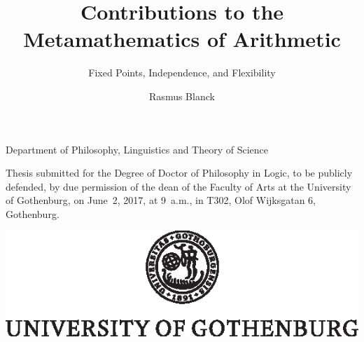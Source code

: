 \documentclass[paper=148mm:209mm,twoside,pagesize=pdftex]{scrartcl}
\title{Contributions to the Metamathematics of Arithmetic}
\subtitle{Fixed Points, Independence, and Flexibility}
\author{Rasmus Blanck}
\begin{document}
\pagestyle{empty}
\begin{center}
\fontsize{17}{20}\selectfont
\vspace*{\baselineskip}

\begin{addmargin}{10mm}
\begin{center}
\bgroup
{}
\makeatletter{\@title\par}\makeatother
\egroup
\end{center}
 \end{addmargin}

 
\fontsize{11}{14}\selectfont
\vspace{.5\baselineskip}
\bgroup{} \makeatletter{\@subtitle\par}\makeatother\egroup
 

\vspace{2\baselineskip}
\fontsize{11}{14}\selectfont
\makeatletter{\@author\par}\makeatother
\vspace{.5\baselineskip}

Department of Philosophy, Linguistics and Theory of Science

\end{center}
\fontsize{11}{14}\selectfont
\vspace{2\baselineskip}

\begin{addmargin}{8.6mm}
Thesis submitted for the Degree of Doctor of Philosophy in Logic, to be publicly defended, by due permission of the dean of the Faculty of Arts at the University of Gothenburg, on June~2, 2017, at 9~a.m., in T302, Olof Wijksgatan 6, Gothenburg. 
\end{addmargin}



\vfill
\begin{center}
\includegraphics[scale=.8]{LO_GUeng_cenSV.eps} 
\end{center}




\newpage
\end{document}
